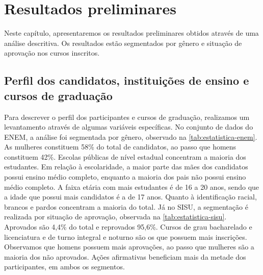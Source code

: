 \chapter{Resultados preliminares}
\label{chap:resultados-preliminares}
Neste capítulo, apresentaremos os resultados preliminares obtidos através de uma análise descritiva. Os resultados estão segmentados por gênero e situação de aprovação nos cursos inscritos.

\section{Perfil dos candidatos, instituições de ensino e cursos de graduação}
Para descrever o perfil dos participantes e cursos de graduação, realizamos um levantamento através de algumas variáveis específicas. No conjunto de dados do ENEM, a análise foi segmentada por gênero, observado na \autoref{tab:estatistica-enem}. As mulheres constituem 58\% do total de candidatos, ao passo que homens constituem 42\%. Escolas públicas de nível estadual concentram a maioria dos estudantes. Em relação à escolaridade, a maior parte das mães dos candidatos possui ensino médio completo, enquanto a maioria dos pais não possui ensino médio completo. A faixa etária com mais estudantes é de 16 a 20 anos, sendo que a idade que possui mais candidatos é a de 17 anos. Quanto à identificação racial, brancos e pardos concentram a maioria do total. Já no SISU, a segmentação é realizada por situação de aprovação, observada na \autoref{tab:estatistica-sisu}. Aprovados são 4,4\% do total e reprovados 95,6\%. Cursos de grau bacharelado e licenciatura e de turno integral e noturno são os que possuem mais inscrições. Observamos que homens possuem mais aprovações, ao passo que mulheres são a maioria dos não aprovados. Ações afirmativas beneficiam mais da metade dos participantes, em ambos os segmentos.

